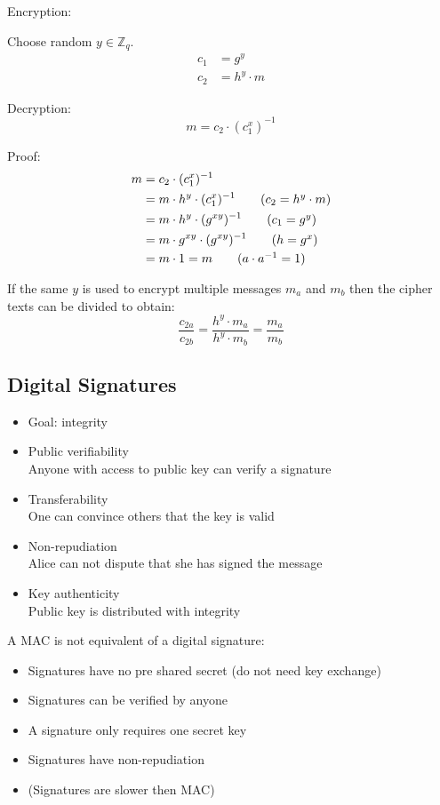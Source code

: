 \documentclass[a4paper]{article}
\begin{document}
Encryption:

Choose random $y \in \mathbb{Z}_{q}$.
\begin{align*}
  c_{1} &= g^{y} \\
  c_{2} &= h^{y} \cdot m
\end{align*}

Decryption:
\[
  m = c_{2} \cdot (c_{1}^{x})^{-1}
\]

Proof:
\begin{align*}
  m &= c_{2} \cdot (c_{1}^{x})^{-1} \\
    &= m \cdot h^{y} \cdot (c_{1}^{x})^{-1}   \tag*{($c_{2} = h^{y} \cdot m$)} \\
    &= m \cdot h^{y} \cdot (g^{xy})^{-1}      \tag*{($c_{1} = g^{y})$} \\
    &= m \cdot g^{xy} \cdot (g^{xy})^{-1}     \tag*{($h = g^{x}$)} \\
    &= m \cdot 1 = m                          \tag*{($a \cdot a^{-1} = 1$)}
\end{align*}


If the same $y$ is used to encrypt multiple messages $m_{a}$ and $m_{b}$ then
the cipher texts can be divided to obtain:
\[
  \frac{c_{2a}}{c_{2b}} = \frac{h^{y} \cdot m_{a}}{h^{y} \cdot m_{b}}
                        = \frac{m_{a}}{m_{b}}
\]

\subsection{Digital Signatures}

\begin{itemize}
  \item Goal: integrity
  \item
    Public verifiability \\
    Anyone with access to public key can verify a signature
  \item
    Transferability \\
    One can convince others that the key is valid
  \item
    Non-repudiation \\
    Alice can not dispute that she has signed the message
  \item
    Key authenticity \\
    Public key is distributed with integrity
\end{itemize}

A MAC is not equivalent of a digital signature:
\begin{itemize}
  \item Signatures have no pre shared secret (do not need key exchange)
  \item Signatures can be verified by anyone
  \item A signature only requires one secret key
  \item Signatures have non-repudiation
  \item (Signatures are slower then MAC)
\end{itemize}
\end{document}
